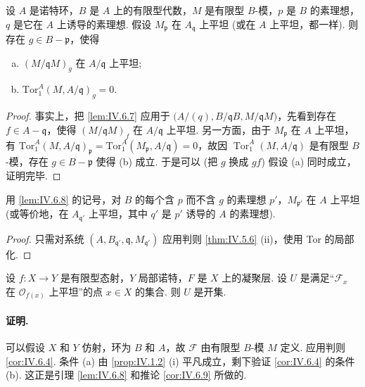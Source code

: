 \begin{lemma}\label{lem:IV.6.8}
设 $A$ 是诺特环，$B$ 是 $A$ 上的有限型代数，$M$ 是有限型 $B$-模，$p$ 是 $B$ 的素理想，$q$ 是它在 $A$ 上诱导的素理想. 假设 $M_{\mathfrak{p}}$ 在 $A_{\mathfrak{q}}$ 上平坦 (或在 $A$ 上平坦，都一样). 则存在 $g \in B - \mathfrak{p}$，使得
\begin{enumerate}[a)]
\item $(M/\mathfrak{q}M)_g$ 在 $A/\mathfrak{q}$ 上平坦; 
\item $\mathrm{Tor}_{1}^{A}(M, A/\mathfrak{q})_g = 0$.
\end{enumerate}
\end{lemma}

\begin{proof}
事实上，把 \ref{lem:IV.6.7} 应用于 $\bigl(A/(q), B/\mathfrak{q}B, M/\mathfrak{q}M\bigr)$，先看到存在 $f \in A - \mathfrak{q}$，使得 $(M/\mathfrak{q}M)_f$ 在 $A/\mathfrak{q}$ 上平坦. 另一方面，由于 $M_{\mathfrak{p}}$ 在 $A$ 上平坦，有 $\mathrm{Tor}_{1}^{A}(M, A/\mathfrak{q})_{\mathfrak{p}} = \mathrm{Tor}_{1}^{A}(M_{\mathfrak{p}}, A/\mathfrak{q}) = 0$，故因 $\operatorname{Tor}_{1}^{A}(M, A/\mathfrak{q})$ 是有限型 $B$-模，存在 $g \in B - \mathfrak{p}$ 使得 (b) 成立. 于是可以 (把 $g$ 换成 $gf$) 假设 (a) 同时成立，证明完毕.
\end{proof}

\begin{corollary}\label{cor:IV.6.9}
用 \ref{lem:IV.6.8} 的记号，对 $B$ 的每个含 $p$ 而不含 $g$ 的素理想 $p'$，$M_{\mathfrak{p}'}$ 在 $A$ 上平坦 (或等价地，在 $A_{\mathfrak{q}'}$ 上平坦，其中 $q'$ 是 $p'$ 诱导的 $A$ 的素理想).
\end{corollary}

\begin{proof}
只需对系统 $(A, B_{\mathfrak{q}'}, \mathfrak{q}, M_{\mathfrak{q}'})$ 应用判则 \ref{thm:IV.5.6} (ii)，使用 Tor 的局部化.
\end{proof}

\begin{theorem}\label{thm:IV.6.10}
设 $f \colon X \to Y$ 是有限型态射，$Y$ 局部诺特，$F$ 是 $X$ 上的凝聚层. 设 $U$ 是满足``$\mathcal{F}_x$ 在 $\mathcal{O}_{f(x)}$ 上平坦''的点 $x \in X$ 的集合. 则 $U$ 是开集.
\end{theorem}

\paragraph*{证明.} 可以假设 $X$ 和 $Y$ 仿射，环为 $B$ 和 $A$，故 $\mathcal{F}$ 由有限型 $B$-模 $M$ 定义. 应用判则 \ref{cor:IV.6.4}. 条件 (a) 由 \ref{prop:IV.1.2} (i) 平凡成立，剩下验证 \ref{cor:IV.6.4} 的条件 (b). 这正是引理 \ref{lem:IV.6.8} 和推论 \ref{cor:IV.6.9} 所做的.


